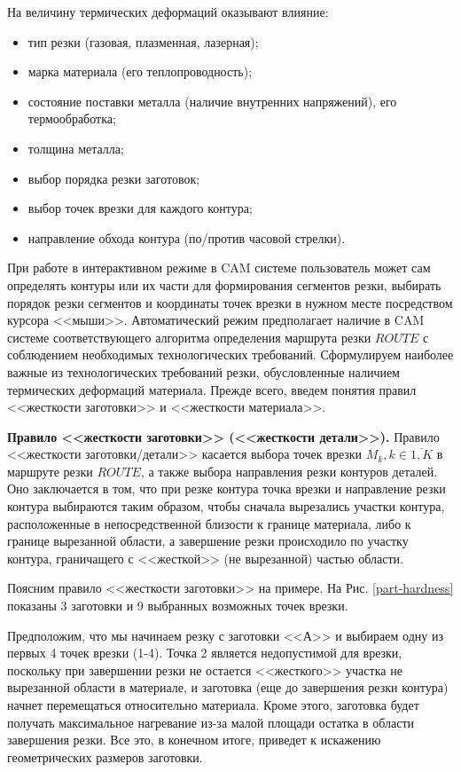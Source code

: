 \documentclass[11pt,twoside]{report}
\begin{document}
На величину термических деформаций оказывают влияние:
\begin{itemize}
\item	тип резки (газовая, плазменная, лазерная);
\item	марка материала (его теплопроводность);
\item	состояние поставки металла (наличие внутренних напряжений), его термообработка;
\item	толщина металла;
\item	выбор порядка резки заготовок;
\item	выбор точек врезки для каждого контура;
\item	направление обхода контура (по/против часовой стрелки).
\end{itemize}

При работе в интерактивном режиме в CAM системе
пользователь может сам определять контуры или их части
для формирования сегментов резки,
выбирать порядок резки сегментов и координаты точек врезки
в нужном месте посредством курсора <<мыши>>.
Автоматический режим предполагает наличие в CAM системе
соответствующего алгоритма определения маршрута резки $ROUTE$
с соблюдением необходимых технологических требований.
Сформулируем наиболее важные из технологических требований резки,
обусловленные наличием термических деформаций материала.
Прежде всего, введем понятия правил <<жесткости заготовки>> и <<жесткости материала>>.

{\bf Правило <<жесткости заготовки>> (<<жесткости детали>>).}
Правило <<жесткости заготовки/детали>> касается выбора точек врезки
$M_k, k \in \overline{1,K}$
в маршруте резки  $ROUTE$,
а также выбора направления резки контуров деталей.
Оно заключается в том, что при резке контура точка
врезки и направление резки контура выбираются таким образом,
чтобы сначала вырезались участки контура,
расположенные в непосредственной близости к границе материала,
либо к границе вырезанной области,
а завершение резки происходило по участку контура,
граничащего с <<жесткой>> (не вырезанной) частью области.

Поясним правило <<жесткости заготовки>> на примере.
На Рис. \ref{part-hardness}
показаны 3 заготовки и 9 выбранных возможных точек врезки.

Предположим, что мы начинаем резку с заготовки <<А>>
и выбираем одну из первых 4 точек врезки (1-4).
Точка 2 является недопустимой для врезки,
поскольку при завершении резки не остается
<<жесткого>> участка не вырезанной области в материале,
и заготовка (еще до завершения резки контура)
начнет перемещаться относительно материала.
Кроме этого, заготовка будет получать максимальное
нагревание из-за малой площади остатка в области завершения резки.
Все это, в конечном итоге,
приведет к искажению геометрических размеров заготовки.
\end{document}
